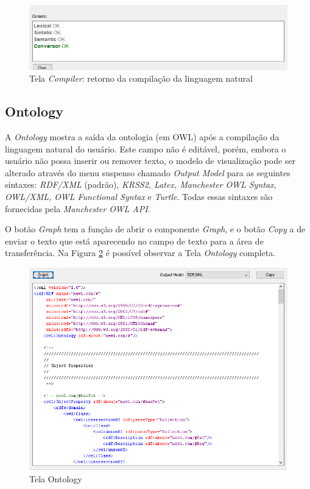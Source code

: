 \documentclass{bcc}
\begin{document}
\begin{figure}[H]
\centering
\includegraphics[width=.7\textwidth]{Figuras/tela_compiler2.png}
\caption{Tela \textit{Compiler}: retorno da compilação da linguagem natural}
\label{fig:telaCompiler2}
\end{figure}

\subsection{Ontology}

A \textit{Ontology} mostra a saída da ontologia (em OWL) após a compilação da linguagem natural do usuário. Este campo não é editável, porém, embora o usuário não possa inserir ou remover texto, o modelo de visualização pode ser alterado através do menu suspenso chamado \textit{Output Model} para as seguintes sintaxes: \textit{RDF/XML} (padrão), \textit{KRSS2, Latex, Manchester OWL Syntax, OWL/XML, OWL Functional Syntax} e \textit{Turtle}. Todas essas sintaxes são fornecidas pela \textit{Manchester OWL API}. 

O botão \textit{Graph} tem a função de abrir o componente \textit{Graph}, e o botão \textit{Copy} a de enviar o texto que está aparecendo no campo de texto para a área de transferência. Na Figura \ref{fig:telaOntology} é possível observar a Tela \textit{Ontology} completa.

\begin{figure}[H]
\centering
\includegraphics[width=.7\textwidth]{Figuras/tela_ontology.png}
\caption{Tela Ontology}
\label{fig:telaOntology}
\end{figure}
\end{document}
